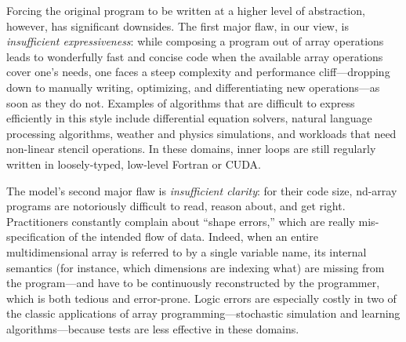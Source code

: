 \documentclass[acmsmall,screen,nonacm]{acmart}
\begin{document}
Forcing the original program to be written at a higher level of abstraction, however, has significant downsides.
The first major flaw, in our view, is \emph{insufficient expressiveness}: while composing a program out of array operations leads to wonderfully fast and concise code when the available array operations cover one's needs, one faces a steep complexity and performance cliff---dropping down to manually writing, optimizing, and differentiating new operations---as soon as they do not.
Examples of algorithms that are difficult to express efficiently in this style include differential equation solvers, natural language processing algorithms, weather and physics simulations, and workloads that need non-linear stencil operations.
In these domains, inner loops are still regularly written in loosely-typed, low-level Fortran or CUDA.

The model's second major flaw is \emph{insufficient clarity}: for their code size, nd-array programs are notoriously difficult to read, reason about, and get right.
Practitioners constantly complain about ``shape errors,'' which are really mis-specification of the intended flow of data.
Indeed, when an entire multidimensional array is referred to by a single variable name, its internal semantics (for instance, which dimensions are indexing what) are missing from the program---and have to be continuously reconstructed by the programmer, which is both tedious and error-prone. %
Logic errors are especially costly in two of the classic applications of array programming---stochastic simulation and learning algorithms---because tests are less effective in these domains.
\end{document}
